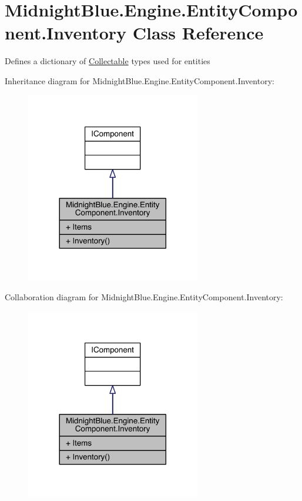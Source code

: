 \hypertarget{class_midnight_blue_1_1_engine_1_1_entity_component_1_1_inventory}{}\section{Midnight\+Blue.\+Engine.\+Entity\+Component.\+Inventory Class Reference}
\label{class_midnight_blue_1_1_engine_1_1_entity_component_1_1_inventory}


Defines a dictionary of \hyperlink{class_midnight_blue_1_1_engine_1_1_collectable}{Collectable} types used for entities  




Inheritance diagram for Midnight\+Blue.\+Engine.\+Entity\+Component.\+Inventory\+:
\nopagebreak
\begin{figure}[H]
\begin{center}
\leavevmode
\includegraphics[width=216pt]{class_midnight_blue_1_1_engine_1_1_entity_component_1_1_inventory__inherit__graph}
\end{center}
\end{figure}


Collaboration diagram for Midnight\+Blue.\+Engine.\+Entity\+Component.\+Inventory\+:
\nopagebreak
\begin{figure}[H]
\begin{center}
\leavevmode
\includegraphics[width=216pt]{class_midnight_blue_1_1_engine_1_1_entity_component_1_1_inventory__coll__graph}
\end{center}
\end{figure}
